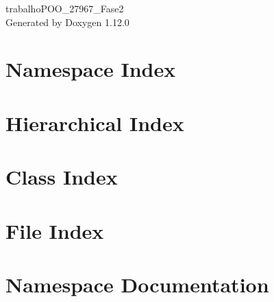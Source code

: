 \documentclass[twoside]{book}
\newcommand{\+}{\discretionary{\mbox{\scriptsize$\hookleftarrow$}}{}{}}
\newcommand{\clearemptydoublepage}{%
    \newpage{\pagestyle{empty}\cleardoublepage}%
  }
\begin{document}
  \raggedbottom
    \hypersetup{pageanchor=false,
                bookmarksnumbered=true,
                pdfencoding=unicode
               }
  \begin{titlepage}
  \vspace*{7cm}
  \begin{center}%
  {\Large trabalho\+POO\+\_\+27967\+\_\+\+Fase2}\\
  \vspace*{1cm}
  {\large Generated by Doxygen 1.12.0}\\
  \end{center}
  \end{titlepage}
  \clearemptydoublepage
  \tableofcontents
  \clearemptydoublepage
  \hypersetup{pageanchor=true}
\chapter{Namespace Index}

\chapter{Hierarchical Index}

\chapter{Class Index}

\chapter{File Index}

\chapter{Namespace Documentation}









\end{document}

